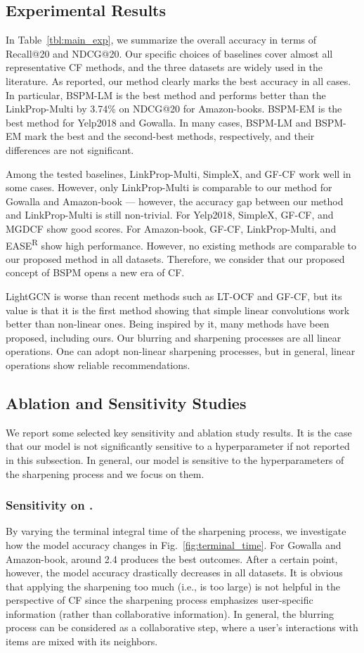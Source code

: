 \documentclass[sigconf,natbib=true]{acmart}
\begin{document}
\subsection{Experimental Results}
In Table~\ref{tbl:main_exp}, we summarize the overall accuracy in terms of Recall@20 and NDCG@20. Our specific choices of baselines cover almost all representative CF methods, and the three datasets are widely used in the literature. As reported, our method clearly marks the best accuracy in all cases. In particular, BSPM-LM is the best method and performs better than the LinkProp-Multi by 3.74\% on NDCG@20 for Amazon-books. BSPM-EM is the best method for Yelp2018 and Gowalla. In many cases, BSPM-LM and BSPM-EM mark the best and the second-best methods, respectively, and their differences are not significant. 


Among the tested baselines, LinkProp-Multi, SimpleX, and GF-CF work well in some cases. However, only LinkProp-Multi is comparable to our method for Gowalla and Amazon-book --- however, the accuracy gap between our method and  LinkProp-Multi is still non-trivial. For Yelp2018, SimpleX, GF-CF, and MGDCF show good scores. For Amazon-book, GF-CF, LinkProp-Multi, and EASE\textsuperscript{R} show high performance. However, no existing methods are comparable to our proposed method in all datasets. Therefore, we consider that our proposed concept of BSPM opens a new era of CF.

LightGCN is worse than recent methods such as LT-OCF and GF-CF, but its value is that it is the first method showing that simple linear convolutions work better than non-linear ones. Being inspired by it, many methods have been proposed, including ours. Our blurring and sharpening processes are all linear operations. One can adopt non-linear sharpening processes, but in general, linear operations show reliable recommendations.


\subsection{Ablation and Sensitivity Studies}
We report some selected key sensitivity and ablation study results. It is the case that our model is not significantly sensitive to a hyperparameter if not reported in this subsection. In general, our model is sensitive to the hyperparameters of the sharpening process and we focus on them.

\subsubsection{Sensitivity on .} By varying the terminal integral time  of the sharpening process, we investigate how the model accuracy changes in Fig.~\ref{fig:terminal_time}. For Gowalla and Amazon-book,  around 2.4 produces the best outcomes. After a certain point, however, the model accuracy drastically decreases in all datasets. It is obvious that applying the sharpening too much (i.e.,  is too large) is not helpful in the perspective of CF since the sharpening process emphasizes user-specific information (rather than collaborative information). In general, the blurring process can be considered as a collaborative step, where a user's interactions with items are mixed with its neighbors.
\end{document}
